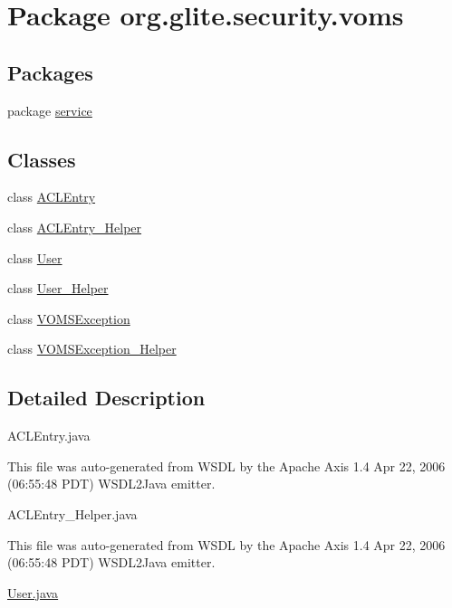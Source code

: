 \hypertarget{namespaceorg_1_1glite_1_1security_1_1voms}{
\section{Package org.glite.security.voms}
\label{namespaceorg_1_1glite_1_1security_1_1voms}
}
\subsection*{Packages}
\begin{DoxyCompactItemize}
\item 
package \hyperlink{namespaceorg_1_1glite_1_1security_1_1voms_1_1service}{service}
\end{DoxyCompactItemize}
\subsection*{Classes}
\begin{DoxyCompactItemize}
\item 
class \hyperlink{classorg_1_1glite_1_1security_1_1voms_1_1ACLEntry}{ACLEntry}
\item 
class \hyperlink{classorg_1_1glite_1_1security_1_1voms_1_1ACLEntry__Helper}{ACLEntry\_\-Helper}
\item 
class \hyperlink{classorg_1_1glite_1_1security_1_1voms_1_1User}{User}
\item 
class \hyperlink{classorg_1_1glite_1_1security_1_1voms_1_1User__Helper}{User\_\-Helper}
\item 
class \hyperlink{classorg_1_1glite_1_1security_1_1voms_1_1VOMSException}{VOMSException}
\item 
class \hyperlink{classorg_1_1glite_1_1security_1_1voms_1_1VOMSException__Helper}{VOMSException\_\-Helper}
\end{DoxyCompactItemize}


\subsection{Detailed Description}
ACLEntry.java

This file was auto-\/generated from WSDL by the Apache Axis 1.4 Apr 22, 2006 (06:55:48 PDT) WSDL2Java emitter.

ACLEntry\_\-Helper.java

This file was auto-\/generated from WSDL by the Apache Axis 1.4 Apr 22, 2006 (06:55:48 PDT) WSDL2Java emitter.

\hyperlink{User_8java}{User.java}

